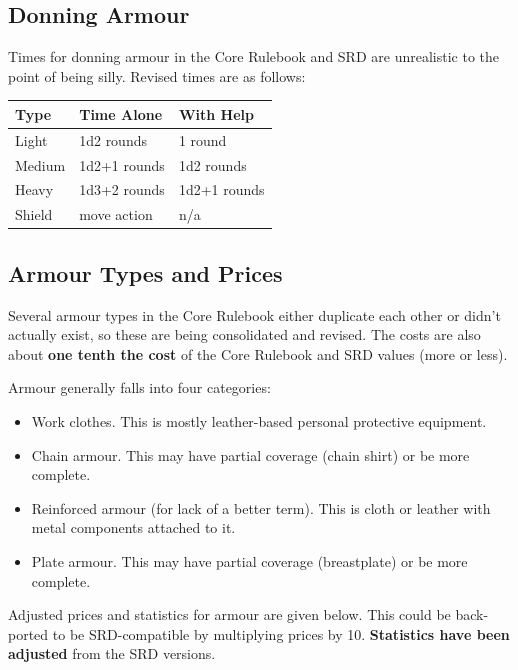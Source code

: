 %
\subsection{Donning Armour}

Times for donning armour in the Core Rulebook and SRD are unrealistic to
the point of being silly. Revised times are as follows:

\begin{tabular}{lll} \hline
\textbf{Type} & \textbf{Time Alone} & \textbf{With Help} \\ \hline
Light & 1d2 rounds & 1 round \\
Medium & 1d2+1 rounds & 1d2 rounds \\
Heavy & 1d3+2 rounds & 1d2+1 rounds \\
Shield & move action & n/a \\
\hline
\end{tabular}
%

%
\subsection{Armour Types and Prices}

Several armour types in the Core Rulebook either duplicate each other or
didn't actually exist, so these are being consolidated and revised. The
costs are also about \textbf{one tenth the cost} of the Core Rulebook and
SRD values (more or less).

Armour generally falls into four categories:
\begin{itemize}
\item Work clothes. This is mostly leather-based personal protective
equipment.
\item Chain armour. This may have partial coverage (chain shirt) or be more
complete.
\item Reinforced armour (for lack of a better term). This is cloth or
leather with metal components attached to it.
\item Plate armour. This may have partial coverage (breastplate) or be more
complete.
\end{itemize}

Adjusted prices and statistics for armour are given below. This could be
back-ported to be SRD-compatible by multiplying prices by 10.
\textbf{Statistics have been adjusted} from the SRD versions.

